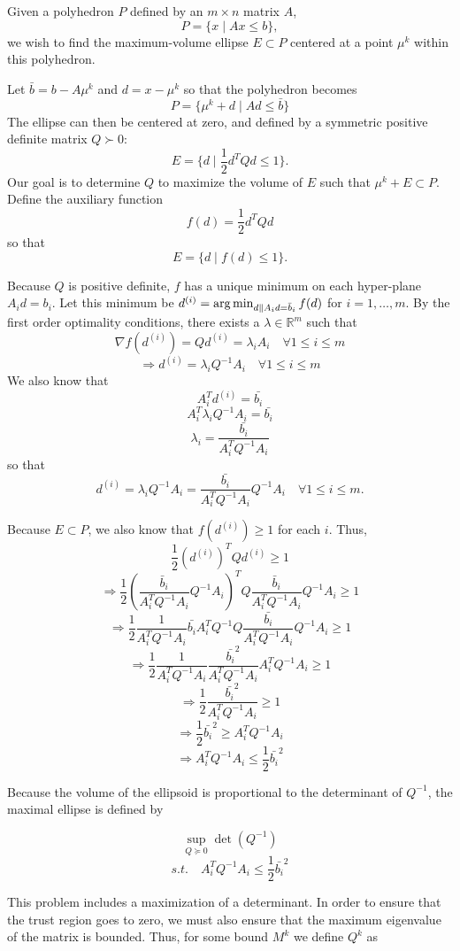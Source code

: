Given a polyhedron $P$ defined by an $m \times n$ matrix $A$,
\[
P = \{ x \; | \;  Ax \le b \},
\]
we wish to find the maximum-volume ellipse $E \subset P$ centered at a point $\mu^{k}$ within this polyhedron.

Let $\bar{b} = b - A\mu^{k}$ and $d = x - \mu^{k}$ so that the polyhedron becomes
\[
P = \{ \mu^k + d \; | \;  Ad \le \bar{b} \}
\]
The ellipse can then be centered at zero, and defined by a symmetric positive definite matrix $Q \succ 0$:
\[
E = \{ d \; | \; \frac 1 2 d^T Q d \le 1 \}.
\]
Our goal is to determine $Q$ to maximize the volume of $E$ such that $\mu^{k} + E \subset P$.
Define the auxiliary function 
\[
f(d) = \frac 1 2 d^T Q d
\]
so that 
\[
E = \{ d \; | \; f(d) \le 1 \}.
\]

Because $Q$ is positive definite, $f$ has a unique minimum on each hyper-plane $A_i d = b_i$.
Let this minimum be $d^{(i)} = \operatorname*{arg\,min}_{d\| A_id =\bar{b}_i} f(d)$ for $i=1,\ldots,m$.
By the first order optimality conditions, there exists a $\lambda \in \mathbb R^m$ such that
\[
\nabla f(d^{(i)}) = Q d^{(i)} = \lambda_i A_i \quad \forall 1\le i\le m
\]
\[
\Rightarrow d^{(i)} = \lambda_i Q^{-1}A_i \quad \forall 1\le i\le m
\]
We also know that 
\[
A_i^T d^{(i)} = \bar{b_i}
\]
\[
A_i^T \lambda_i Q^{-1}A_i = \bar{b_i}
\]
\[
\lambda_i = \frac {\bar{b_i}}{A_i^T  Q^{-1}A_i}
\]
so that 
\[
d^{(i)} = \lambda_i Q^{-1}A_i = \frac {\bar{b_i}}{A_i^T  Q^{-1}A_i}  Q^{-1}A_i \quad \forall 1\le i\le m.
\]

Because $E \subset P$, we also know that $f(d^{(i)}) \ge 1$ for each $i$. Thus,
\[
\frac 1 2 (d^{(i)})^{T} Q d^{(i)} \ge 1
\]
\[
\Rightarrow \frac 1 2 (\frac {\bar{b}_i}{A_i^T  Q^{-1}A_i}  Q^{-1}A_i)^{T} Q \frac {\bar{b}_i}{A_i^T  Q^{-1}A_i}  Q^{-1}A_i \ge 1
\]
\[
\Rightarrow \frac 1 2 \frac {1}{A_i^T  Q^{-1}A_i}  \bar{b_i} A_i^T Q^{-1} Q \frac {\bar{b_i}}{A_i^T  Q^{-1}A_i}  Q^{-1}A_i \ge 1
\]
\[
\Rightarrow \frac 1 2 \frac {1}{A_i^T  Q^{-1}A_i}  \frac {\bar{b_i}^2}{A_i^T  Q^{-1}A_i}  A_i^T Q^{-1}A_i \ge 1
\]
\[
\Rightarrow \frac 1 2  \frac {\bar{b_i}^2}{A_i^T  Q^{-1}A_i} \ge 1
\]
\[
\Rightarrow \frac 1 2 \bar{b_i}^2\ge A_i^T  Q^{-1}A_i
\]
\[
\Rightarrow A_i^T  Q^{-1}A_i \le \frac 1 2 \bar{b_i}^2
\]

Because the volume of the ellipsoid is proportional to the determinant of $Q^{-1}$, the maximal ellipse is defined by

\[
\sup_{Q \succeq 0} \det(Q^{-1})
\]
\[
s.t. \quad A_i^T Q^{-1} A_i \le \frac 1 2 \bar{b_i}^2
\]


This problem includes a maximization of a determinant.
In order to ensure that the trust region goes to zero, we must also ensure that the maximum eigenvalue of the matrix is bounded.
Thus, for some bound $M^k$ we define $Q^k$ as


